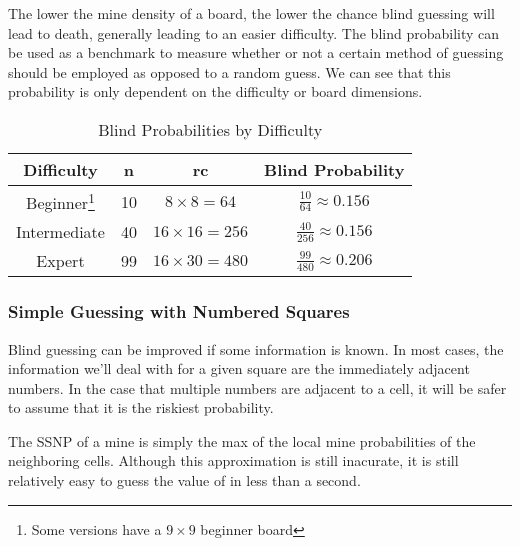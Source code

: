 The lower the mine density of a board, the lower the chance blind guessing will lead to death, generally leading to an easier difficulty. The blind probability can be used as a benchmark to measure whether or not a certain method of guessing should be employed as opposed to a random guess. We can see that this probability is only dependent on the difficulty or board dimensions.

\begin{table}[h]
    \centering
    \begin{tabular}{|c|c|c|c|}\hline
        Difficulty & n & rc & Blind Probability\\\hline
        Beginner\footnote{Some versions have a $9\times9$ beginner board} & 10 & $8\times8=64$ & $\frac{10}{64}\approx\mathbf{0.156}$ \\ %
        Intermediate & 40 & $16\times16=256$ & $\frac{40}{256}\approx\mathbf{0.156}$\\
        Expert & 99 & $16\times30=480$ & $\frac{99}{480}\approx\mathbf{0.206}$\\\hline
    \end{tabular}
    \caption{Blind Probabilities by Difficulty}
    \label{tab:blind-probabilities}
\end{table}


\subsubsection*{Simple Guessing with Numbered Squares}
Blind guessing can be improved if some information is known. In most cases, the information we'll deal with for a given square are the immediately adjacent numbers. In the case that multiple numbers are adjacent to a cell, it will be safer to assume that it is the riskiest probability.\\


The SSNP of a mine is simply the max of the local mine probabilities of the neighboring cells. Although this approximation is still inacurate, it is still relatively easy to guess the value of in less than a second.\\

